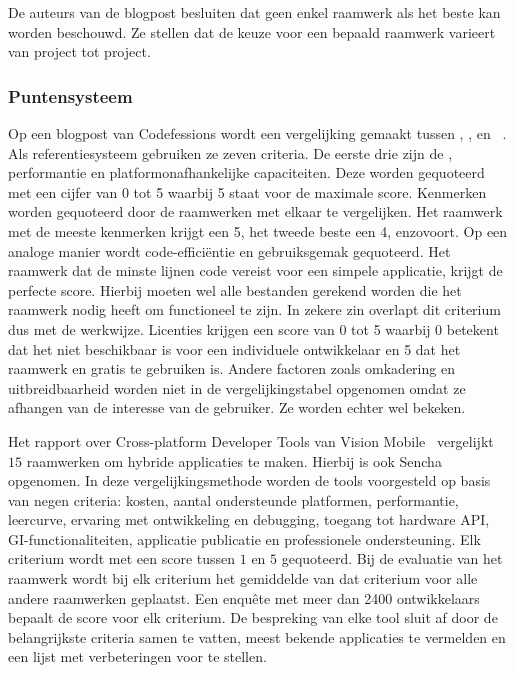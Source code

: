 De auteurs van de blogpost besluiten dat geen enkel raamwerk als het beste kan worden beschouwd.
Ze stellen dat de keuze voor een bepaald raamwerk varieert van project tot project.

\subsubsection{Puntensysteem}
\label{sec:manier-puntensysteem}
Op een blogpost van Codefessions wordt een vergelijking gemaakt tussen \jqm{}, \st{}, \jqt{} en \kendo{}~\cite{Sarrafi2012a}.  
Als referentiesysteem gebruiken ze zeven criteria.  
De eerste drie zijn de , performantie en platformonafhankelijke capaciteiten.  
Deze worden gequoteerd met een cijfer van 0 tot 5 waarbij 5 staat voor de maximale score.
Kenmerken worden gequoteerd door de raamwerken met elkaar te vergelijken.  
Het raamwerk met de meeste kenmerken krijgt een 5, het tweede beste een 4, enzovoort. 
Op een analoge manier wordt code-efficiëntie en gebruiksgemak gequoteerd.  
Het raamwerk dat de minste lijnen code vereist voor een simpele applicatie, krijgt de perfecte score. 
Hierbij moeten wel alle bestanden gerekend worden die het raamwerk nodig heeft om functioneel te zijn. 
In zekere zin overlapt dit criterium dus met de  werkwijze.
Licenties krijgen een score van 0 tot 5 waarbij 0 betekent dat het niet beschikbaar is voor een individuele ontwikkelaar en 5 dat het raamwerk  en gratis te gebruiken is. 
Andere factoren zoals omkadering en uitbreidbaarheid worden niet in de vergelijkingstabel opgenomen omdat ze afhangen van de interesse van de gebruiker.  
Ze worden echter wel bekeken.

Het rapport over Cross-platform Developer Tools van Vision Mobile~\cite{Mobile2012} vergelijkt $15$ raamwerken om hybride applicaties te maken.
Hierbij is ook Sencha opgenomen.
In deze vergelijkingsmethode worden de tools voorgesteld op basis van negen criteria:  kosten,  aantal ondersteunde platformen,  performantie,  leercurve,  ervaring met ontwikkeling en debugging,  toegang tot hardware API,  GI-functionaliteiten,  applicatie publicatie en professionele ondersteuning.
Elk criterium wordt met een score tussen $1$ en $5$ gequoteerd.
Bij de evaluatie van het raamwerk wordt bij elk criterium het gemiddelde van dat criterium voor alle andere raamwerken geplaatst.
Een enquête met meer dan 2400 ontwikkelaars bepaalt de score voor elk criterium.
De bespreking van elke tool sluit af door de belangrijkste criteria samen te vatten,  meest bekende applicaties te vermelden en een lijst met verbeteringen voor te stellen.

